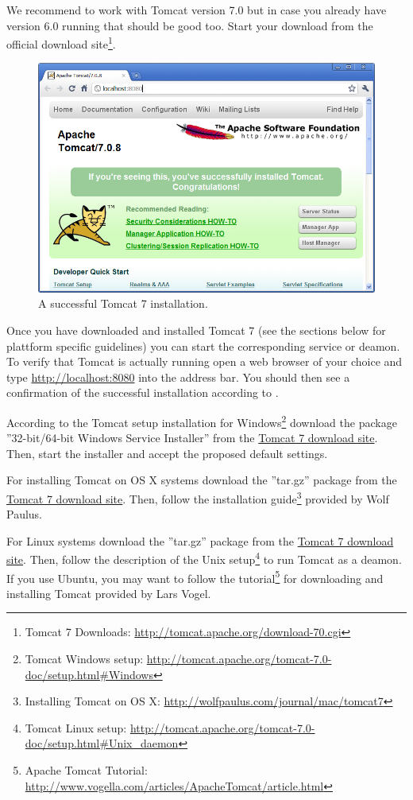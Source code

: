 \documentclass[a4paper,10pt,twoside]{book}
\begin{document}
We recommend to work with Tomcat version 7.0 but in case you already have version 6.0 running that should be good too.
Start your download from the official download site\footnote{
Tomcat 7 Downloads: \url{http://tomcat.apache.org/download-70.cgi}
}.

\begin{figure}
\includegraphics[width=13cm]{tomcat_install.png}
\caption{A successful Tomcat 7 installation.}
\end{figure}

Once you have downloaded and installed Tomcat 7 (see the sections below for plattform specific guidelines) you can start the corresponding service or deamon.
To verify that Tomcat is actually running open a web browser of your choice and type \url{http://localhost:8080} into the address bar.
You should then see a confirmation of the successful installation according to .

According to the Tomcat setup installation for Windows\footnote{
Tomcat Windows setup: \url{http://tomcat.apache.org/tomcat-7.0-doc/setup.html#Windows}
}
download the package ''32-bit/64-bit Windows Service Installer'' from the \href{http://tomcat.apache.org/download-70.cgi}{Tomcat 7 download site}.
Then, start the installer and accept the proposed default settings.

For installing Tomcat on OS X systems download the ''tar.gz'' package from the \href{http://tomcat.apache.org/download-70.cgi}{Tomcat 7 download site}.
Then, follow the installation guide\footnote{
Installing Tomcat on OS X: \url{http://wolfpaulus.com/journal/mac/tomcat7}
} provided by Wolf Paulus.

For Linux systems download the ''tar.gz'' package from the \href{http://tomcat.apache.org/download-70.cgi}{Tomcat 7 download site}.
Then, follow the description of the Unix setup\footnote{
Tomcat Linux setup: \url{http://tomcat.apache.org/tomcat-7.0-doc/setup.html#Unix_daemon}
}
to run Tomcat as a deamon.
If you use Ubuntu, you may want to follow the tutorial\footnote{
Apache Tomcat Tutorial: \url{http://www.vogella.com/articles/ApacheTomcat/article.html}
} 
for downloading and installing Tomcat provided by Lars Vogel.
\end{document}
